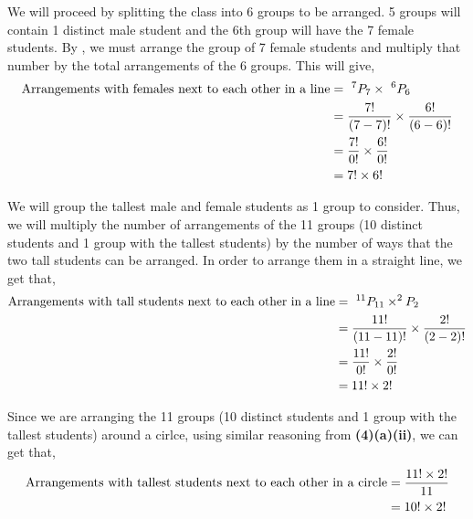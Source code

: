 \begin{subquestions}
\begin{subsubquestions}
\subsubquestion 	
	
We will proceed by splitting the class into 6 groups to be arranged. 5 groups will contain 1 distinct male student and the 6th group will have the 7 female students. By , we must arrange the group of 7 female students and multiply that number by the total arrangements of the 6 groups. This will give,
\begin{align}
	\text{Arrangements with females next to each other in a line} & = ~^7P_7 \times ~^6P_6 \nonumber \\
	                                            & = \frac{7!}{(7-7)!} \times \frac{6!}{(6-6)!} \nonumber \\
	                                            & = \frac{7!}{0!} \times \frac{6!}{0!} \nonumber \\
	                                            & = 7! \times 6! 
\end{align}


\subsubquestion

We will group the tallest male and female students as 1 group to consider. Thus, we will multiply the number of arrangements of the 11 groups (10 distinct students and 1 group with the tallest students) by the number of ways that the two tall students can be arranged. In order to arrange them in a straight line, we get that,
\begin{align}
	\text{Arrangements with tall students next to each other in a line} & = ~^{11}P_{11} \times ^{2}P_{2} \nonumber \\
	                                            & = \frac{11!}{(11-11)!} \times \frac{2!}{(2-2)!} \nonumber \\
	                                            & = \frac{11!}{0!} \times \frac{2!}{0!} \nonumber \\
	                                            & = 11! \times 2!
\end{align}

Since we are arranging the 11 groups (10 distinct students and 1 group with the tallest students) around a cirlce, using similar reasoning from \textbf{(4)(a)(ii)}, we can get that,
\begin{align}
	\text{Arrangements with tallest students next to each other in a circle} & = \frac{11! \times 2!}{11} \nonumber \\
																			 & = 10! \times 2! 
\end{align}


\end{subsubquestions}
\end{subquestions}
